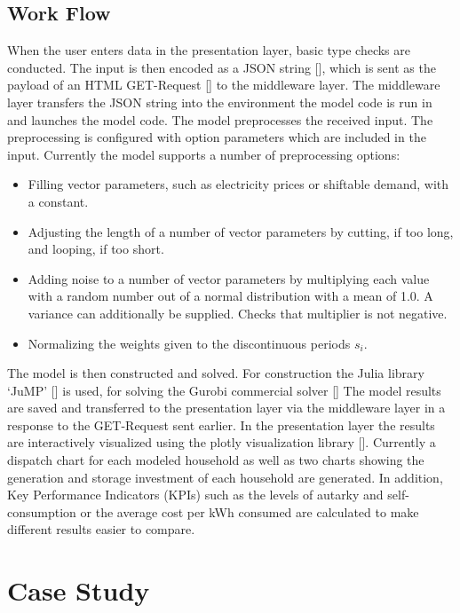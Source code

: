 \documentclass[
	11pt,								%
	DIV10,								%
	a4paper,         					%
	oneside,							%
	headheight=20pt,					%
	footheight=20pt,					%
    parskip=full,						%
    listof=totoc,						%
	bibliography=totoc,					%
	index=totoc,						%
]{scrartcl}
\begin{document}
\subsection{Work Flow}
When the user enters data in the presentation layer, basic type checks are conducted. The input is then encoded as a JSON string [\cite{crockfordIntroducingJSON}], which is sent as the payload of an HTML GET-Request [\cite{fieldingArchitecturalStylesDesign2000}] to the middleware layer. The middleware layer transfers the JSON string into the environment the model code is run in and launches the model code. The model preprocesses the received input. The preprocessing is configured with option parameters which are included in the input. Currently the model supports a number of preprocessing options:
\begin{itemize}
	\item Filling vector parameters, such as electricity prices or shiftable demand, with a constant. 
	\item Adjusting the length of a number of vector parameters by cutting, if too long, and looping, if too short.
	\item Adding noise to a number of vector parameters by multiplying each value with a random number out of a normal distribution with a mean of 1.0. A variance can additionally be supplied. Checks that multiplier is not negative.
	\item Normalizing the weights given to the discontinuous periods $s_i$.
\end{itemize} 
The model is then constructed and solved. For construction the Julia library `JuMP' [\cite{JuMPJlModeling2019}] is used, for solving the Gurobi commercial solver [\cite{GurobiOptimization}] The model results are saved and transferred to the presentation layer via the middleware layer in a response to the GET-Request sent earlier. In the presentation layer the results are interactively visualized using the plotly visualization library [\cite{PlotlyJavascriptOpen2019}]. Currently a dispatch chart for each modeled household as well as two charts showing the generation and storage investment of each household are generated. In addition, Key Performance Indicators (KPIs) such as the levels of autarky and self-consumption or the average cost per kWh consumed are calculated to make different results easier to compare.

\newpage
{}	

\section{Case Study}
\end{document}

